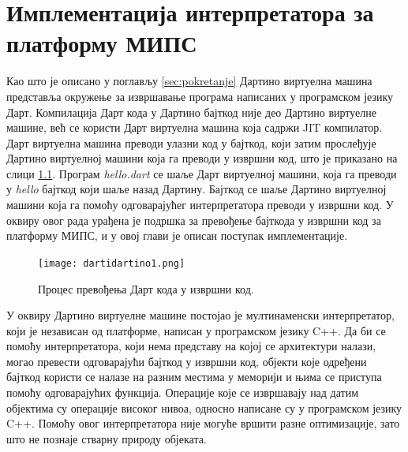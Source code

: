 \documentclass[12pt,oneside]{memoir}
\begin{document}
\chapter[Имплементација МИПС интерпретатора]{Имплементација интерпретатора за платформу МИПС}
\label{chp:implementacija}

Као што је описано у поглављу \ref{sec:pokretanje} Дартино виртуелна машина представља окружење за извршавање програма написаних у програмском језику Дарт. Компилација Дарт кода у Дартино бајткод није део Дартино виртуелне машине, већ се користи Дарт виртуелна машина која садржи JIT компилатор. Дарт виртуелна машина преводи улазни код у бајткод, који затим прослеђује Дартино виртуелној машини која га преводи у извршни код, што је приказано на слици \ref{dartidartino}. Програм \textit{hello.dart} се шаље Дарт виртуелној машини, која га преводи у \textit{hello} бајткод који шаље назад Дартину. Бајткод се шаље Дартино виртуелној машини која га помоћу одговарајућег интерпретатора преводи у извршни код. У оквиру овог рада урађена је подршка за превођење бајткода у извршни код за платформу МИПС, и у овој глави је описан поступак имплементације.

\begin{figure}[!ht]
  \centering
  \texttt{[image: dartidartino1.png]}
  \caption{Процес превођења Дарт кода у извршни код.}
  \label{dartidartino}
\end{figure}

У оквиру Дартино виртуелне машине постојао је мултинаменски интерпретатор, који је независан од платформе, написан у програмском језику C++. Да би се помоћу интерпретатора, који нема представу на којој се архитектури налази, могао превести одговарајући бајткод у извршни код, објекти које одређени бајткод користи се налазе на разним местима у меморији и њима се приступа помоћу одговарајућих функција. Операције које се извршавају над датим објектима су операције високог нивоа, односно написане су у програмском језику C++. Помоћу овог интерпретатора није могуће вршити разне оптимизације, зато што не познаје стварну природу објеката.
\end{document}
